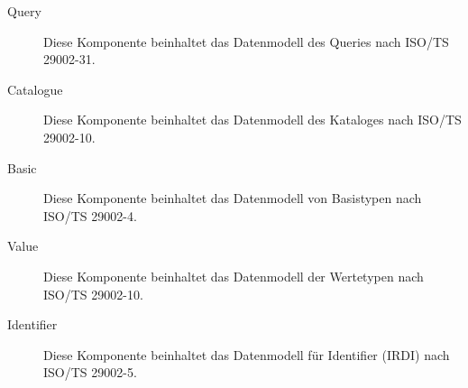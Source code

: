 \begin{description}
\item[Query] Diese Komponente beinhaltet das Datenmodell des Queries nach ISO/TS 29002-31. 
\item[Catalogue] Diese Komponente beinhaltet das Datenmodell des Kataloges nach ISO/TS 29002-10. 
\item[Basic] Diese Komponente beinhaltet das Datenmodell von Basistypen nach ISO/TS 29002-4.
\item[Value] Diese Komponente beinhaltet das Datenmodell der Wertetypen nach ISO/TS 29002-10.
\item[Identifier] Diese Komponente beinhaltet das Datenmodell für Identifier (IRDI) nach ISO/TS 29002-5. 
\end{description}

